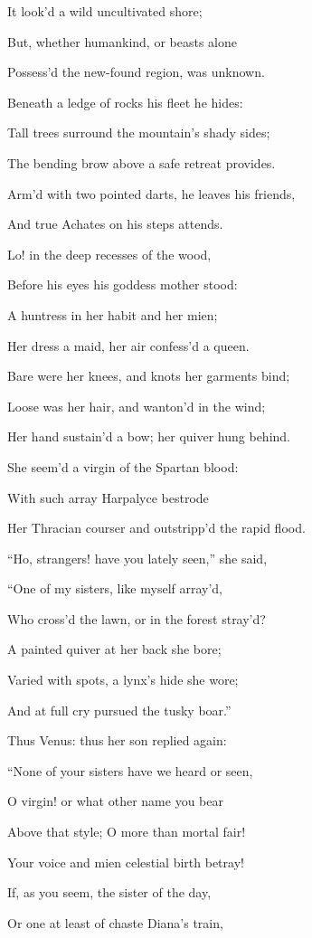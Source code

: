 It look’d a wild uncultivated shore;

But, whether humankind, or beasts alone

Possess’d the new-found region, was unknown.

Beneath a ledge of rocks his fleet he hides:

Tall trees surround the mountain’s shady sides;

The bending brow above a safe retreat provides.

Arm’d with two pointed darts, he leaves his friends,

And true Achates on his steps attends.

Lo! in the deep recesses of the wood,

Before his eyes his goddess mother stood:

A huntress in her habit and her mien;

Her dress a maid, her air confess’d a queen.

Bare were her knees, and knots her garments bind;

Loose was her hair, and wanton’d in the wind;

Her hand sustain’d a bow; her quiver hung behind.

She seem’d a virgin of the Spartan blood:

With such array Harpalyce bestrode

Her Thracian courser and outstripp’d the rapid flood.

“Ho, strangers! have you lately seen,” she said,

“One of my sisters, like myself array’d,

Who cross’d the lawn, or in the forest stray’d?

A painted quiver at her back she bore;

Varied with spots, a lynx’s hide she wore;

And at full cry pursued the tusky boar.”

Thus Venus: thus her son replied again:

“None of your sisters have we heard or seen,

O virgin! or what other name you bear

Above that style; O more than mortal fair!

Your voice and mien celestial birth betray!

If, as you seem, the sister of the day,

Or one at least of chaste Diana’s train,

